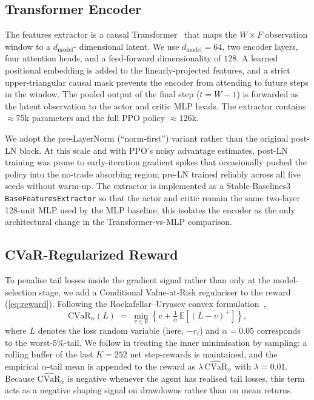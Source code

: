 \documentclass[conference]{IEEEtran}
\begin{document}
\subsection{Transformer Encoder}
\label{sec:method:transformer}

The features extractor is a causal Transformer~\cite{vaswani2017attention}
that maps the $W \times F$ observation window to a $d_{\text{model}}$-
dimensional latent. We use $d_{\text{model}}{=}64$, two encoder layers,
four attention heads, and a feed-forward dimensionality of $128$. A
learned positional embedding is added to the linearly-projected features,
and a strict upper-triangular causal mask prevents the encoder from
attending to future steps in the window. The pooled output of the final
step ($t = W{-}1$) is forwarded as the latent observation to the actor
and critic MLP heads. The extractor contains $\approx\!75\text{k}$
parameters and the full PPO policy $\approx\!126\text{k}$.

We adopt the pre-LayerNorm (``norm-first'') variant rather than the
original post-LN block. At this scale and with PPO's noisy advantage
estimates, post-LN training was prone to early-iteration gradient spikes
that occasionally pushed the policy into the no-trade absorbing region;
pre-LN trained reliably across all five seeds without warm-up. The
extractor is implemented as a Stable-Baselines3
\texttt{BaseFeaturesExtractor} so that the actor and critic remain the
same two-layer 128-unit MLP used by the MLP baseline; this isolates the
encoder as the only architectural change in the Transformer-vs-MLP
comparison.

\subsection{CVaR-Regularized Reward}
\label{sec:method:cvar}

To penalise tail losses inside the gradient signal rather than only at
the model-selection stage, we add a Conditional Value-at-Risk regulariser
to the reward (\ref{eq:reward}). Following the
Rockafellar--Uryasev convex
formulation~\cite{rockafellar2000cvar},
\begin{equation}
  \text{CVaR}_\alpha(L) \;=\; \min_{v\in\mathbb{R}}
       \left\{ v + \tfrac{1}{\alpha}\,
              \mathbb{E}\!\left[(L - v)^{+}\right] \right\},
  \label{eq:cvar}
\end{equation}
where $L$ denotes the loss random variable (here, $-r_t$) and
$\alpha = 0.05$ corresponds to the worst-$5\%$-tail. We follow
\cite{tamar2015cvar} in treating the inner minimisation by sampling: a
rolling buffer of the last $K{=}252$ net step-rewards is maintained, and
the empirical $\alpha$-tail mean is appended to the reward as
$\lambda\,\widehat{\text{CVaR}}_\alpha$ with $\lambda = 0.01$. Because
$\widehat{\text{CVaR}}_\alpha$ is negative whenever the agent has
realised tail losses, this term acts as a negative shaping signal on
drawdowns rather than on mean returns.
\end{document}
